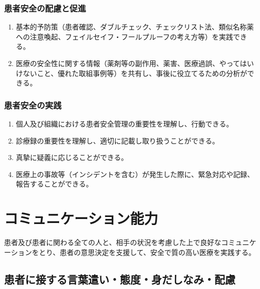 \hypertarget{ux60a3ux8005ux5b89ux5168ux306eux914dux616eux3068ux4fc3ux9032-1}{%
\subsubsection{患者安全の配慮と促進}\label{ux60a3ux8005ux5b89ux5168ux306eux914dux616eux3068ux4fc3ux9032-1}}

\begin{enumerate}
\def\labelenumi{\arabic{enumi}.}
\tightlist
\item
  基本的予防策（患者確認、ダブルチェック、チェックリスト法、類似名称薬への注意喚起、フェイルセイフ・フールプルーフの考え方等）を実践できる。
\item
  医療の安全性に関する情報（薬剤等の副作用、薬害、医療過誤、やってはいけないこと、優れた取組事例等）を共有し、事後に役立てるための分析ができる。
\end{enumerate}

\hypertarget{ux60a3ux8005ux5b89ux5168ux306eux5b9fux8df5-1}{%
\subsubsection{患者安全の実践}\label{ux60a3ux8005ux5b89ux5168ux306eux5b9fux8df5-1}}

\begin{enumerate}
\def\labelenumi{\arabic{enumi}.}
\tightlist
\item
  個人及び組織における患者安全管理の重要性を理解し、行動できる。
\item
  診療録の重要性を理解し、適切に記載し取り扱うことができる。
\item
  真摯に疑義に応じることができる。
\item
  医療上の事故等（インシデントを含む）が発生した際に、緊急対応や記録、報告することができる。
\end{enumerate}

\newpage

\hypertarget{ux30b3ux30dfux30e5ux30cbux30b1ux30fcux30b7ux30e7ux30f3ux80fdux529b}{%
\section{コミュニケーション能力}\label{ux30b3ux30dfux30e5ux30cbux30b1ux30fcux30b7ux30e7ux30f3ux80fdux529b}}

患者及び患者に関わる全ての人と、相手の状況を考慮した上で良好なコミュニケーションをとり、患者の意思決定を支援して、安全で質の高い医療を実践する。

\hypertarget{ux60a3ux8005ux306bux63a5ux3059ux308bux8a00ux8449ux9063ux3044ux614bux5ea6ux8eabux3060ux3057ux306aux307fux914dux616e}{%
\subsection{患者に接する言葉遣い・態度・身だしなみ・配慮}\label{ux60a3ux8005ux306bux63a5ux3059ux308bux8a00ux8449ux9063ux3044ux614bux5ea6ux8eabux3060ux3057ux306aux307fux914dux616e}}

